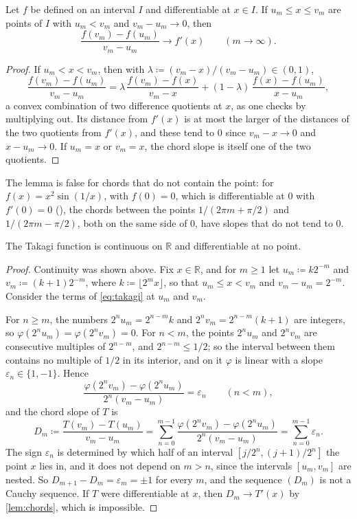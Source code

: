 \begin{lemma}
\label{lem:chords}
Let $f$ be defined on an interval $I$ and differentiable at $x\in I$. If $u_m\le x\le v_m$ are points of $I$ with $u_m<v_m$ and $v_m-u_m\to0$, then
\[
\frac{f(v_m)-f(u_m)}{v_m-u_m}\to f'(x)\qquad(m\to\infty).
\]
\end{lemma}

\begin{proof}
If $u_m<x<v_m$, then with $\lambda\coloneqq(v_m-x)/(v_m-u_m)\in(0,1)$,
\[
\frac{f(v_m)-f(u_m)}{v_m-u_m}=\lambda\,\frac{f(v_m)-f(x)}{v_m-x}+(1-\lambda)\,\frac{f(x)-f(u_m)}{x-u_m} ,
\]
a convex combination of two difference quotients at $x$, as one checks by multiplying out. Its distance from $f'(x)$ is at most the larger of the distances of the two quotients from $f'(x)$, and these tend to $0$ since $v_m-x\to0$ and $x-u_m\to0$. If $u_m=x$ or $v_m=x$, the chord slope is itself one of the two quotients.
\end{proof}

The lemma is false for chords that do not contain the point: for $f(x)=x^2\sin(1/x)$, with $f(0)=0$, which is differentiable at $0$ with $f'(0)=0$ (), the chords between the points $1/(2\pi m+\pi/2)$ and $1/(2\pi m-\pi/2)$, both on the same side of $0$, have slopes that do not tend to $0$.

\begin{theorem}[Takagi]
\label{thm:takagi}
The Takagi function is continuous on $\mathbb R$ and differentiable at no point.
\end{theorem}

\begin{proof}
Continuity was shown above. Fix $x\in\mathbb R$, and for $m\ge1$ let $u_m\coloneqq k2^{-m}$ and $v_m\coloneqq(k+1)2^{-m}$, where $k\coloneqq\lfloor2^mx\rfloor$, so that $u_m\le x<v_m$ and $v_m-u_m=2^{-m}$. Consider the terms of \eqref{eq:takagi} at $u_m$ and $v_m$.

For $n\ge m$, the numbers $2^nu_m=2^{n-m}k$ and $2^nv_m=2^{n-m}(k+1)$ are integers, so $\varphi(2^nu_m)=\varphi(2^nv_m)=0$. For $n<m$, the points $2^nu_m$ and $2^nv_m$ are consecutive multiples of $2^{n-m}$, and $2^{n-m}\le1/2$; so the interval between them contains no multiple of $1/2$ in its interior, and on it $\varphi$ is linear with a slope $\varepsilon_n\in\{1,-1\}$. Hence
\[
\frac{\varphi(2^nv_m)-\varphi(2^nu_m)}{2^n(v_m-u_m)}=\varepsilon_n\qquad(n<m),
\]
and the chord slope of $T$ is
\[
D_m\coloneqq\frac{T(v_m)-T(u_m)}{v_m-u_m}=\sum_{n=0}^{m-1}\frac{\varphi(2^nv_m)-\varphi(2^nu_m)}{2^n(v_m-u_m)}=\sum_{n=0}^{m-1}\varepsilon_n .
\]
The sign $\varepsilon_n$ is determined by which half of an interval $[j/2^n,(j+1)/2^n]$ the point $x$ lies in, and it does not depend on $m>n$, since the intervals $[u_m,v_m]$ are nested. So $D_{m+1}-D_m=\varepsilon_m=\pm1$ for every $m$, and the sequence $(D_m)$ is not a Cauchy sequence. If $T$ were differentiable at $x$, then $D_m\to T'(x)$ by \cref{lem:chords}, which is impossible.
\end{proof}

